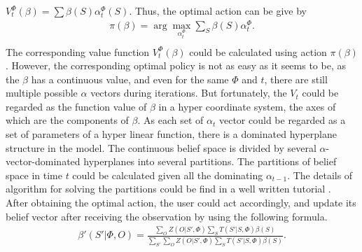 \documentclass[conference]{IEEEtran}
\begin{document}
\(V_t^\Phi\left(\beta\right) = \sum\beta\left(S\right)\alpha_t^\Phi\left(S\right)\).
Thus, the optimal action can be give by
\begin{equation}
\begin{aligned}
	\pi\left(\beta\right) =
	\arg\underset{\alpha_t^\Phi}{\max}\sum\limits_{S}\beta\left(S\right)\alpha_t^\Phi.\\
\end{aligned}
\end{equation}
The corresponding value function \(V_t^\Phi\left(\beta\right)\) could be calculated using action \(\pi\left(\beta\right)\).
However, the corresponding optimal policy is not as easy as it seems to be, as the \(\beta\) has a continuous value,
and even for the same \(\Phi\) and \(t\), there are still multiple possible \(\alpha\) vectors during iterations.
But fortunately, the \(V_t\) could be regarded as the function value of \(\beta\) in a hyper coordinate system,
the axes of which are the components of \(\beta\).
As each set of \(\alpha_t\) vector could be regarded as a set of parameters of a hyper linear function,
there is a dominated hyperplane structure in the model.
The continuous belief space is divided by several \(\alpha\)-vector-dominated hyperplanes into several partitions.
The partitions of belief space in time \(t\) could be calculated given all the dominating \(\alpha_{t-1}\).
The details of algorithm for solving the partitions could be find in a well written tutorial \cite{pomdptool}.\\
\indent
After obtaining the optimal action, the user could act accordingly,
and update its belief vector after receiving the observation by using the following formula.
\begin{align}
	\beta'\left(S'|\Phi, O\right) = \frac{\sum_{O}Z\left(O|S',\Phi\right)\sum_{S}
	T\left(S'|S,\Phi\right)\beta\left(S\right)}
	{\sum_{S'}\sum_{O}Z\left(O|S',\Phi\right)\sum_{S}T\left(S'|S,\Phi\right)\beta\left(S\right)}.
\end{align}
\end{document}
